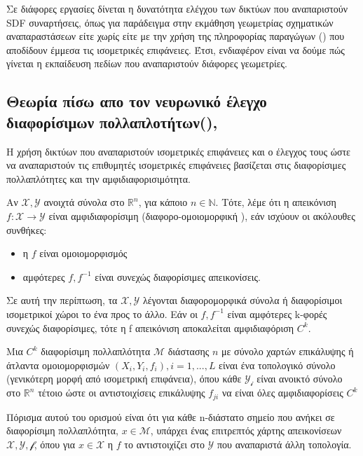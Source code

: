 Σε διάφορες εργασίες δίνεται η δυνατότητα ελέγχου των δικτύων που αναπαριστούν SDF συναρτήσεις, όπως για παράδειγμα στην εκμάθηση γεωμετρίας σχηματικών αναπαραστάσεων είτε χωρίς είτε με την χρήση της πληροφορίας παραγώγων ()\cite{atzmon2020sal, atzmon2020sald} που αποδίδουν έμμεσα τις ισομετρικές επιφάνειες. Έτσι, ενδιαφέρον είναι να δούμε πώς γίνεται η εκπαίδευση πεδίων  που αναπαριστούν διάφορες γεωμετρίες.

\subsection{Θεωρία πίσω απο τον νευρωνικό έλεγχο  διαφορίσιμων πολλαπλοτήτων()\cite{DBLP:journals/corr/abs-1905-11911}, \cite{haykin2009neural}}
Η χρήση δικτύων που αναπαριστούν ισομετρικές επιφάνειες και ο έλεγχος τους ώστε να αναπαριστούν τις επιθυμητές ισομετρικές επιφάνειες βασίζεται στις διαφορίσιμες πολλαπλότητες και την αμφιδιαφορισιμότητα.
\begin{definition}
    Αν $\mathcal{X},\mathcal{Y}$  ανοιχτά σύνολα στο $\mathbb{R}^{n}$, για κάποιο  $n\in \mathbb{N}$. Τότε, λέμε ότι η απεικόνιση $f: \mathcal{X} \rightarrow \mathcal{Y}$ είναι αμφιδιαφορίσιμη (διαφορο-ομοιομορφική ), εάν ισχύουν οι ακόλουθες συνθήκες:
    \begin{itemize}
        \item  η $f$ είναι ομοιομορφισμός
        \item αμφότερες $f,f^{-1}$ είναι συνεχώς διαφορίσιμες απεικονίσεις.
    \end{itemize}
    Σε αυτή την περίπτωση, τα $\mathcal{X},\mathcal{Y}$ λέγονται διαφορομορφικά σύνολα ή διαφορίσιμοι ισομετρικοί χώροι το ένα προς το άλλο. Εάν οι $f,f^{-1}$ είναι αμφότερες k-φορές συνεχώς διαφορίσιμες, τότε η f απεικόνιση αποκαλείται αμφιδιαφόριση $C^{k}$.
\end{definition}
\begin{definition}
    Μια $C^{k}$ διαφορίσιμη πολλαπλότητα $\mathcal{M}$ διάστασης $n$ με σύνολο
    χαρτών επικάλυψης ή άτλαντα ομοιομορφισμών  $(X_{i},Y_{i},f_{i}),  i = 1,...,L$ είναι ένα τοπολογικό σύνολο (γενικότερη μορφή από ισομετρική επιφάνεια), όπου κάθε $\mathcal{Y_{i}}$ είναι ανοικτό σύνολο στο $\mathbb{R}^{n}$ τέτοιο ώστε οι αντιστοιχίσεις επικάλυψης $f_{ji}$ να είναι όλες αμφιδιαφορίσεις $C^{k}$  
\end{definition}
\begin{corollary}
Πόρισμα αυτού του ορισμού είναι ότι για κάθε n-διάστατο σημείο που ανήκει σε διαφορίσιμη πολλαπλότητα, $x \in \mathcal{M}$, υπάρχει ένας επιτρεπτός χάρτης απεικονίσεων $\mathcal{X,Y,f}$, όπου για $x\in \mathcal{X}$ η $f$ το αντιστοιχίζει στο $\mathcal{Y}$ που αναπαριστά άλλη τοπολογία.
\end{corollary}
    
